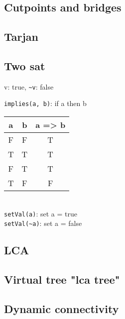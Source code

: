 
\subsection{Cutpoints and bridges }

\subsection{Tarjan }

\subsection{Two sat }

v: true, \lstinline{~v}: false

\lstinline{implies(a, b)}: if a then b \\
\begin{tabular}{ |c |c |c|  }
\hline 
a & b &  a => b \\
\hline 
F & F  &   T \\
T & T  &   T \\
F & T   &  T \\
T & F  &   F \\
\hline
\end{tabular} \\

\lstinline{setVal(a)}: set a = true \\
\lstinline{setVal(~a)}: set a = false \\

\subsection{LCA }

\subsection{Virtual tree  "lca tree"}


\subsection{Dynamic connectivity }

